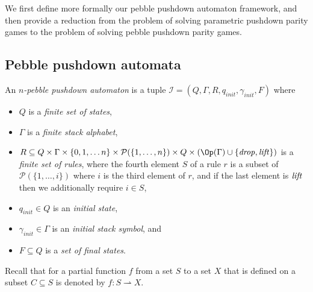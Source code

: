 We first define more formally our pebble pushdown automaton framework, and then provide a reduction from the problem of solving parametric pushdown parity games to the problem of solving pebble pushdown parity games.



\subsection{Pebble pushdown automata}

\newcommand{\ppda}{\mathcal{I}}

An {\em $n$-pebble pushdown automaton} 
is a tuple 
$\ppda = (Q, \Gamma,  R, q_{init}, \gamma_{init}, F)$
where
\begin{itemize}
\item $Q$ is a {\em finite set of  states},
\item $\Gamma$ is a {\em finite stack alphabet},
\item  $R  \subseteq  Q  \times \Gamma \times
		 \{ 0, 1, \ldots n\} \times \mathcal{P}(\{1,\ldots,n\})
		 \times Q  \times (\Op(\Gamma) \cup \{\text{\textit{drop}}, \text{\textit{lift}}\})$ is a {\em finite set of rules},
		 where the fourth element $S$ of a rule $r$ is a subset of 
		$\mathcal{P}(\{1,\ldots,i\})$ where $i$ is the third element of $r$,
		and if the last element is
		$\text{\textit{lift}}$ then we additionally require $i \in S$,
\item $q_{init} \in Q$ is an {\em initial  state}, 
\item $\gamma_{init} \in \Gamma$ is an {\em initial stack symbol}, and
\item $F \subseteq Q$ is a {\em set of final  states}.
\end{itemize}

 
 
\par\noindent\ignorespacesafterend 
Recall that for \iffalse a partial function $f$ from a set $S$ to a set $X$ 
that is defined on a subset $C \subseteq S$
is denoted by
$ f : S \rightharpoonup X $.

